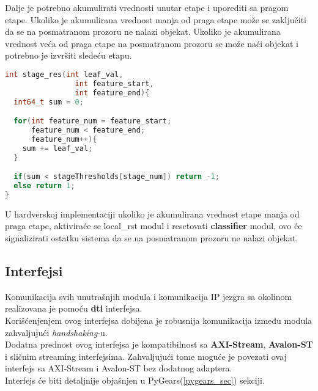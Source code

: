 Dalje je potrebno akumulirati vrednosti unutar etape i uporediti sa pragom
etape.
Ukoliko je akumulirana vrednost manja od praga etape može se zaključiti da se na
posmatranom prozoru ne nalazi objekat.
Ukoliko je akumulirana vrednost veća od praga etape na posmatranom prozoru se
može naći objekat i potrebno je izvršiti sledeću etapu. \\

\begin{lstlisting}[language=C++,caption={Leaf\_val u \textbf{C}-u},captionpos=b, label=leaf_val_code]
  int stage_res(int leaf_val,
                int feature_start,
                int feature_end){
  int64_t sum = 0;

  for(int feature_num = feature_start;
      feature_num < feature_end;
      feature_num++){
    sum += leaf_val;
  }

  if(sum < stageThresholds[stage_num]) return -1;
  else return 1;
}
\end{lstlisting}

U hardverskoj implementaciji ukoliko je akumulirana vrednost etape manja od
praga etape, aktiviraće se local\_rst modul i resetovati \textbf{classifier}
modul, ovo će signalizirati ostatku sistema da se na posmatranom prozoru ne
nalazi objekat. \\

\subsection{Interfejsi}

Komunikacija svih unutrašnjih modula i komunikacija IP jezgra sa okolinom
realizovana je pomoću \textbf{\gls{dti}}\cite{PyGears_OSDA} interfejsa. \\
Korišćenjenjem ovog interfejsa dobijena je robusnija komunikacija između
modula zahvaljujući \emph{handshaking}-u. \\

Dodatna prednost ovog interfejsa je kompatibilnost sa \textbf{AXI-Stream}\cite{AXI_INTF}, \textbf{Avalon-ST}\cite{AVALON_INTF}
i sličnim streaming interfejsima. Zahvaljujući tome moguće je povezati ovaj
interfejs sa AXI-Stream i Avalon-ST bez dodatnog adaptera. \\

Interfejs će biti detaljnije objašnjen u PyGears(\ref{pygears_sec}) sekciji.